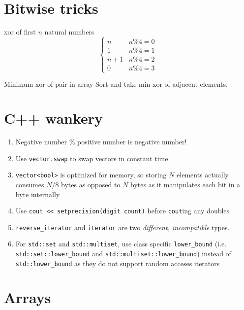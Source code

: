 \documentclass[titlepage, 12pt]{book}
\begin{document}
\chapter{Bitwise tricks}

\begin{algorithm}{xor of first $n$ natural numbers}{}
  \[ \begin{cases}
    n     & n \% 4 = 0 \\
    1     & n \% 4 = 1 \\
    n + 1 & n \% 4 = 2 \\
    0     & n \% 4 = 3
  \end{cases}
\]
\end{algorithm}

\begin{algorithm}{Minimum xor of pair in array}{}
  Sort and take min xor of adjacent elements.
\end{algorithm}

\chapter{C++ wankery}
\begin{enumerate}
  \item Negative number \% positive number is negative number!
  \item Use \verb|vector.swap| to swap vectors in constant time
  \item \verb|vector<bool>| is optimized for memory, so storing $N$ elements
    actually consumes $N/8$ bytes as opposed to $N$ bytes as it manipulates each
    bit in a byte internally
  \item Use \verb|cout << setprecision(digit count)| before \verb|cout|ing any
    doubles
  \item \verb|reverse_iterator| and \verb|iterator| are two \textit{different,
    incompatible} types.
  \item For \verb|std::set| and \verb|std::multiset|, use class specific
    \verb|lower_bound| (i.e. \verb|std::set::lower_bound| and
    \verb|std::multiset::lower_bound|) instead of \verb|std::lower_bound| as
    they do not support random acceses iterators
\end{enumerate}

\chapter{Arrays}
\end{document}
